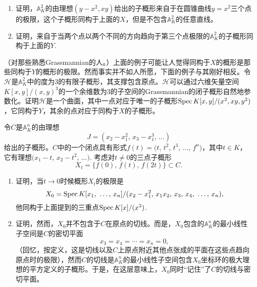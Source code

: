 \begin{exe}
	\begin{enumerate}[{(i)}]\setlength{\itemsep}{0pt}
		\item 证明，$\mathbb{A}_K^2$的由理想$(y-x^2,xy)$给出的子概形来自于在圆锥曲线$y=x^2$三个点的极限，这个子概形同构于上面的$X$，但是不包含$\mathbb{A}_K^2$的任意直线。


		\item 证明，来自于当两个点以两个不同的方向趋向于第三个点极限的$\mathbb{A}_K^2$的子概形同构于上面的$Y$.
	\end{enumerate}
\end{exe}

\begin{exe} （对那些熟悉Grassmannian的人。）上面的例子可能让人觉得同构于$X$的概形是那些同构于$Y$的概形的极限。然而事实并不如人所愿，下面的例子与其刚好相反。令$\mathscr{H}$是$\mathbb{A}_K^2$中的度为3的有限子概形，其支撑包含原点。$\mathscr{H}$可以通过六维矢量空间$K[x,y]/(x,y)^3$的一个余维数为3的子空间的Grassmannian的闭子概形自然地参数化。证明$\mathscr{H}$是一个曲面，其中一点对应于唯一的子概形$\operatorname{Spec} K[x,y]/(x^2,xy,y^2)$，它同构于$Y$，其余的点对应于同构于$X$的子概形。
\end{exe}

\begin{exe}
	令$C$是$\mathbb{A}_K^n$的由理想
	\[
	J=(x_2-x_1^2\text{, }x_3-x_1^3\text{, }\dots)
	\]
	给出的子概形。$C$中的一个闭点具有形式$f(t)=(t$, $t^2$, $t^3$, $\dots$, $f^n)$，其中$t\in K$，它有理想$(x_1-t$, $x_2-t^2$, $\dots)$. 考虑对$t\neq 0$的三点子概形
	\[
	X_t=\{f(0)\text{, }f(t)\text{, }f(2t)\}\subset C.
	\]

	\begin{enumerate}[{(a)}]\setlength{\itemsep}{0pt}
		\item 证明，当$t\to 0$时候概形$X_t$的极限是
		\[
		X_0=\operatorname{Spec} K[x_1\text{, }\dots\text{, }x_n]/(x_2-x_1^2\text{, }x_1x_2\text{, }x_3\text{, }x_4\text{, }\dots\text{, }x_n),
		\]
		他同构于上面提到的三重点$\operatorname{Spec} K[x]/(x^3)$.
		\item 证明，然而，$X_0$并不包含于$C$在原点的切线。而是，$X_0$包含的$\mathbb{A}_K^n$的最小线性子空间是$C$的密切平面
		\[
		x_3=x_4=\cdots=x_n=0,
		\]
		（回忆，按定义，这是切线以及$C$上原点附近其他点张成的平面在这些点趋向原点时的极限）\nottran，然而$C$的切线是$\mathbb{A}_K^n$的最小线性子空间包含$X_0$坐标环的极大理想的平方定义的子概形。于是，在这层意味上，$X_0$同时“记住”了$C$的切线与密切平面。
	\end{enumerate}
\end{exe}

